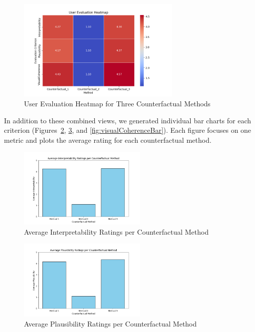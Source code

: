 \begin{figure}[htbp]
    \centering
    \includegraphics[width=0.7\textwidth]{img/results/heatmap_user_evaluations.png}
    \caption{User Evaluation Heatmap for Three Counterfactual Methods}
    \label{fig:heatmap}
\end{figure}

In addition to these combined views, we generated individual bar charts for each criterion (Figures~\ref{fig:interpretabilityBar}, 
\ref{fig:plausibilityBar}, and \ref{fig:visualCoherenceBar}). Each figure focuses on one metric and plots the average rating 
for each counterfactual method.

\begin{figure}[htbp]
    \centering
    \includegraphics[width=0.55\textwidth]{img/results/Interpretability_ratings.png}
    \caption{Average Interpretability Ratings per Counterfactual Method}
    \label{fig:interpretabilityBar}
\end{figure}

\begin{figure}[htbp]
    \centering
    \includegraphics[width=0.55\textwidth]{img/results/Plausibility_ratings.png}
    \caption{Average Plausibility Ratings per Counterfactual Method}
    \label{fig:plausibilityBar}
\end{figure}

